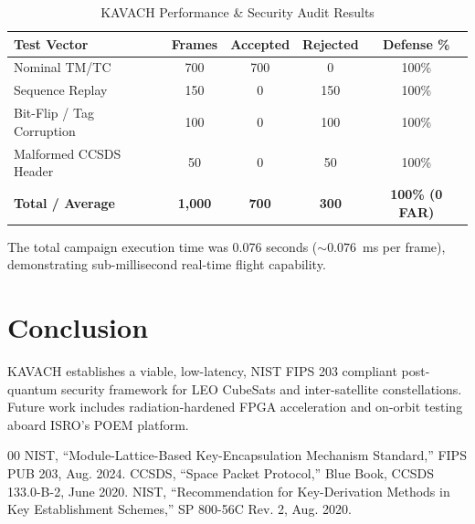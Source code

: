 \documentclass[conference]{IEEEtran}
\begin{document}
\begin{table}[htbp]
\caption{KAVACH Performance \& Security Audit Results}
\begin{center}
\begin{tabular}{lcccc}
\toprule
\textbf{Test Vector} & \textbf{Frames} & \textbf{Accepted} & \textbf{Rejected} & \textbf{Defense \%} \\
\midrule
Nominal TM/TC & 700 & 700 & 0 & 100\% \\
Sequence Replay & 150 & 0 & 150 & 100\% \\
Bit-Flip / Tag Corruption & 100 & 0 & 100 & 100\% \\
Malformed CCSDS Header & 50 & 0 & 50 & 100\% \\
\midrule
\textbf{Total / Average} & \textbf{1,000} & \textbf{700} & \textbf{300} & \textbf{100\% (0 FAR)} \\
\bottomrule
\end{tabular}
\end{center}
\end{table}

The total campaign execution time was 0.076 seconds ($\sim 0.076$~ms per frame), demonstrating sub-millisecond real-time flight capability.

\section{Conclusion}
KAVACH establishes a viable, low-latency, NIST FIPS 203 compliant post-quantum security framework for LEO CubeSats and inter-satellite constellations. Future work includes radiation-hardened FPGA acceleration and on-orbit testing aboard ISRO's POEM platform.

\begin{thebibliography}{00}
 NIST, ``Module-Lattice-Based Key-Encapsulation Mechanism Standard,'' FIPS PUB 203, Aug. 2024.
 CCSDS, ``Space Packet Protocol,'' Blue Book, CCSDS 133.0-B-2, June 2020.
 NIST, ``Recommendation for Key-Derivation Methods in Key Establishment Schemes,'' SP 800-56C Rev. 2, Aug. 2020.
\end{thebibliography}
\end{document}

